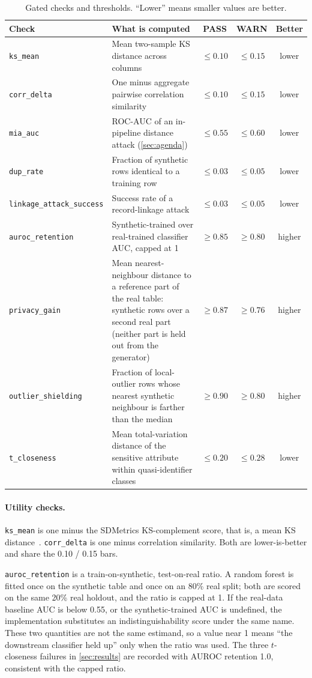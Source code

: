 \documentclass[11pt,a4paper]{article}
\begin{document}
\begin{table}[t]
\centering
\small
\caption{Gated checks and thresholds. ``Lower'' means smaller values are better.}
\label{tab:checks}
\begin{tabularx}{\textwidth}{@{}l L c c c@{}}
\toprule
Check & What is computed & PASS & WARN & Better \\
\midrule
\texttt{ks\_mean} & Mean two-sample KS distance across columns~\cite{massey1951} & $\le 0.10$ & $\le 0.15$ & lower \\
\texttt{corr\_delta} & One minus aggregate pairwise correlation similarity & $\le 0.10$ & $\le 0.15$ & lower \\
\texttt{mia\_auc} & ROC-AUC of an in-pipeline distance attack (\cref{sec:agenda}) & $\le 0.55$ & $\le 0.60$ & lower \\
\texttt{dup\_rate} & Fraction of synthetic rows identical to a training row & $\le 0.03$ & $\le 0.05$ & lower \\
\texttt{linkage\_attack\_success} & Success rate of a record-linkage attack & $\le 0.03$ & $\le 0.05$ & lower \\
\texttt{auroc\_retention} & Synthetic-trained over real-trained classifier AUC, capped at 1 & $\ge 0.85$ & $\ge 0.80$ & higher \\
\texttt{privacy\_gain} & Mean nearest-neighbour distance to a reference part of the real table: synthetic rows over a second real part (neither part is held out from the generator) & $\ge 0.87$ & $\ge 0.76$ & higher \\
\texttt{outlier\_shielding} & Fraction of local-outlier rows whose nearest synthetic neighbour is farther than the median & $\ge 0.90$ & $\ge 0.80$ & higher \\
\texttt{t\_closeness} & Mean total-variation distance of the sensitive attribute within quasi-identifier classes & $\le 0.20$ & $\le 0.28$ & lower \\
\bottomrule
\end{tabularx}
\end{table}

\paragraph{Utility checks.}
\texttt{ks\_mean} is one minus the SDMetrics KS-complement score, that is, a mean KS distance~\cite{massey1951}. \texttt{corr\_delta} is one minus correlation similarity. Both are lower-is-better and share the 0.10 / 0.15 bars.

\texttt{auroc\_retention} is a train-on-synthetic, test-on-real ratio. A random forest is fitted once on the synthetic table and once on an 80\% real split; both are scored on the same 20\% real holdout, and the ratio is capped at 1. If the real-data baseline AUC is below 0.55, or the synthetic-trained AUC is undefined, the implementation substitutes an indistinguishability score under the same name. These two quantities are not the same estimand, so a value near 1 means ``the downstream classifier held up'' only when the ratio was used. The three $t$-closeness failures in \cref{sec:results} are recorded with AUROC retention 1.0, consistent with the capped ratio.
\end{document}
